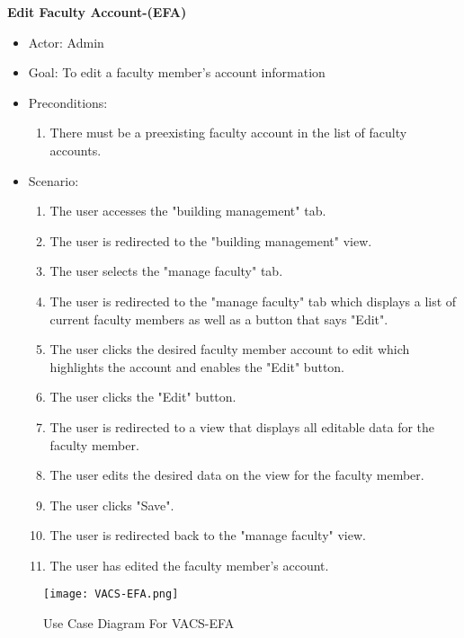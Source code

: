 \documentclass[letterpaper,12pt,oneside,listof=totoc]{scrreprt}
\begin{document}
\hfill \break
\textbf{Edit Faculty Account-(EFA)}
\begin{itemize}
    \item Actor: Admin
    \item Goal: To edit a faculty member's account information
    \item Preconditions:
    \begin{enumerate}
        \item There must be a preexisting faculty account in the list of faculty accounts.
    \end{enumerate}
    \item Scenario:
    \begin{enumerate}
        \item The user accesses the "building management" tab. 
        \item The user is redirected to the "building management" view.
        \item The user selects the "manage faculty" tab.
        \item The user is redirected to the "manage faculty" tab which displays a list of current faculty members as well as a button that says "Edit".
         \item The user clicks the desired faculty member account to edit which highlights the account and enables the "Edit" button.
         \item The user clicks the "Edit" button.
         \item The user is redirected to a view that displays all editable data for the faculty member.
         \item The user edits the desired data on the view for the faculty member.
         \item The user clicks "Save".
         \item The user is redirected back to the "manage faculty" view.
         \item The user has edited the faculty member's account.
    \end{enumerate}
\end{itemize}

\clearpage

\begin{figure}[htbp]
    \centering
    \texttt{[image: VACS-EFA.png]}
    \caption{Use Case Diagram For VACS-EFA}
    \label{fig:VACS-EFA}
\end{figure}

\clearpage
\end{document}
